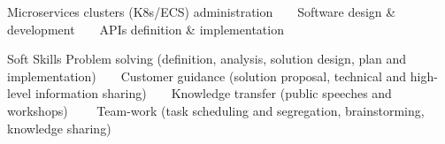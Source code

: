\begin{cvskills}
  \cvskill
{} %
{Microservices clusters (K8s/ECS) administration~~\textbullet~~Software design \& development~~\textbullet~~APIs definition \& implementation} %
    
    
  \cvskill
{Soft Skills} %
{Problem solving (definition, analysis, solution design, plan and implementation)~~\textbullet~~Customer guidance (solution }
  \cvskill
{} %
  {proposal, technical and high-level information sharing)~~\textbullet~~Knowledge transfer (public speeches and workshops)~~\textbullet~~}
\cvskill
{}
{Team-work (task scheduling and segregation, brainstorming, knowledge sharing)} %

\end{cvskills}

